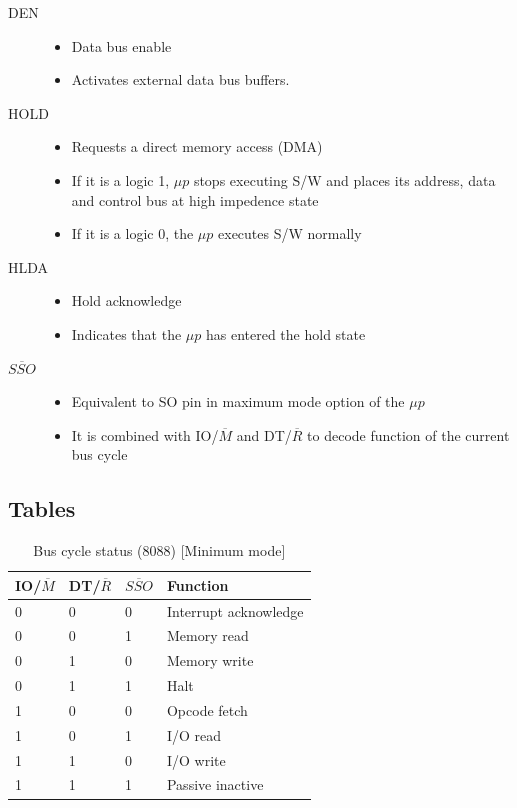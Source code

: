 \documentclass{article}
\begin{document}
\begin{description}
  \item[DEN]
  \begin{itemize}
      \item Data bus enable
      \item Activates external data bus buffers.
  \end{itemize}

  \item[HOLD]
  \begin{itemize}
      \item Requests a direct memory access (DMA)
      \item If it is a logic 1, $\mu p$ stops executing S/W and places its address, data and control
      bus at high impedence state
      \item If it is a logic 0, the $\mu p$ executes S/W normally
  \end{itemize}

  \item[HLDA]
  \begin{itemize}
      \item Hold acknowledge
      \item Indicates that the $\mu p$ has entered the hold state
  \end{itemize}

  \item[$\overline{SSO}$]
  \begin{itemize}
      \item Equivalent to SO pin in maximum mode option of the $\mu p$
      \item It is combined with IO/$\overline{M}$ and DT/$\overline{R}$ to decode function of the current bus cycle
  \end{itemize}

\end{description}
\newpage
\subsection{Tables}

\begin{table}[h!]
\centering
\begin{tabular}{ |p{1cm}|p{1cm}|p{1cm}|p{3cm}|  }
\hline
IO/$ \overline{M} $ & DT/$ \overline{R} $ & $ \overline{SSO} $& Function   \\
\hline
0 & 0 & 0 & Interrupt acknowledge \\
0 & 0 & 1 & Memory read \\
0 & 1 & 0 & Memory write \\
0 & 1 & 1 & Halt \\
1 & 0 & 0 & Opcode fetch \\
1 & 0 & 1 & I/O read \\
1 & 1 & 0 & I/O write \\
1 & 1 & 1 & Passive inactive \\
\hline
\end{tabular}

\caption{Bus cycle status (8088) [Minimum mode]}
\label{table:1}
\end{table}
\end{document}
